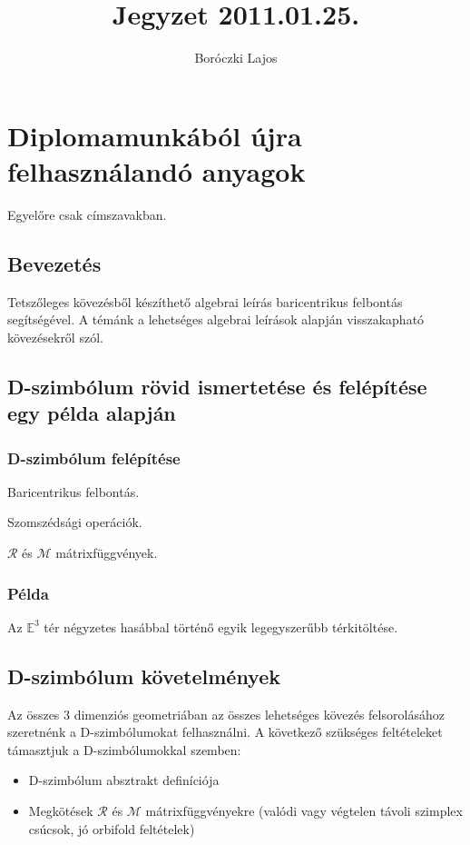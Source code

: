 \documentclass[12pt,magyar,a4paper]{article}
\begin{document}
\title{Jegyzet 2011.01.25.}
\author{Boróczki Lajos}

\maketitle

\section{Diplomamunkából újra felhasználandó anyagok}
Egyelőre csak címszavakban.

\subsection{Bevezetés}
Tetszőleges kövezésből készíthető algebrai leírás baricentrikus felbontás
segítségével. A témánk a lehetséges algebrai leírások alapján visszakapható
kövezésekről szól.

\subsection{D-szimbólum rövid ismertetése és felépítése egy példa alapján}
\subsubsection{D-szimbólum felépítése}
Baricentrikus felbontás.

Szomszédsági operációk.

$\mathcal{R}$ és $\mathcal{M}$ mátrixfüggvények.

\subsubsection{Példa}
Az $\mathbb{E}^3$ tér négyzetes hasábbal történő egyik legegyszerűbb
térkitöltése.

\subsection{D-szimbólum követelmények}
\label{D-sym-cond}
Az összes 3 dimenziós geometriában az összes lehetséges kövezés felsorolásához
szeretnénk a D-szimbólumokat felhasználni. A következő szükséges feltételeket
támasztjuk a D-szimbólumokkal szemben:
\begin{itemize}
  \item D-szimbólum absztrakt definíciója
  \item Megkötések $\mathcal{R}$ és $\mathcal{M}$ mátrixfüggvényekre (valódi
    vagy végtelen távoli szimplex csúcsok, jó orbifold feltételek)
\end{itemize}
\end{document}
